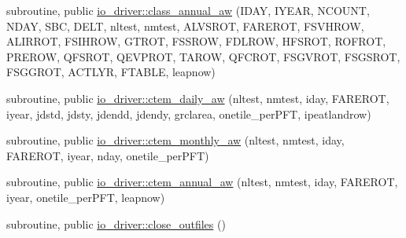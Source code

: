 {\bf }\par
\begin{DoxyCompactItemize}
\item 
subroutine, public \hyperlink{group__io__driver__class__annual__aw_ga0f389a580ed1952081408efc5dee850b}{io\+\_\+driver\+::class\+\_\+annual\+\_\+aw} (I\+D\+A\+Y, I\+Y\+E\+A\+R, N\+C\+O\+U\+N\+T, N\+D\+A\+Y, S\+B\+C, D\+E\+L\+T, nltest, nmtest, A\+L\+V\+S\+R\+O\+T, F\+A\+R\+E\+R\+O\+T, F\+S\+V\+H\+R\+O\+W, A\+L\+I\+R\+R\+O\+T, F\+S\+I\+H\+R\+O\+W, G\+T\+R\+O\+T, F\+S\+S\+R\+O\+W, F\+D\+L\+R\+O\+W, H\+F\+S\+R\+O\+T, R\+O\+F\+R\+O\+T, P\+R\+E\+R\+O\+W, Q\+F\+S\+R\+O\+T, Q\+E\+V\+P\+R\+O\+T, T\+A\+R\+O\+W, Q\+F\+C\+R\+O\+T, F\+S\+G\+V\+R\+O\+T, F\+S\+G\+S\+R\+O\+T, F\+S\+G\+G\+R\+O\+T, A\+C\+T\+L\+Y\+R, F\+T\+A\+B\+L\+E, leapnow)
\end{DoxyCompactItemize}

{\bf }\par
\begin{DoxyCompactItemize}
\item 
subroutine, public \hyperlink{group__io__driver__ctem__daily__aw_gaabb54fc6376839cc19d2b3591a963802}{io\+\_\+driver\+::ctem\+\_\+daily\+\_\+aw} (nltest, nmtest, iday, F\+A\+R\+E\+R\+O\+T, iyear, jdstd, jdsty, jdendd, jdendy, grclarea, onetile\+\_\+per\+P\+F\+T, ipeatlandrow)
\end{DoxyCompactItemize}

{\bf }\par
\begin{DoxyCompactItemize}
\item 
subroutine, public \hyperlink{group__io__driver__ctem__monthly__aw_gaefba66acca4c5138cfa2500f7a030022}{io\+\_\+driver\+::ctem\+\_\+monthly\+\_\+aw} (nltest, nmtest, iday, F\+A\+R\+E\+R\+O\+T, iyear, nday, onetile\+\_\+per\+P\+F\+T)
\end{DoxyCompactItemize}

{\bf }\par
\begin{DoxyCompactItemize}
\item 
subroutine, public \hyperlink{group__io__driver__ctem__annual__aw_gafd1b038009ed17a4f1046e11b88cf383}{io\+\_\+driver\+::ctem\+\_\+annual\+\_\+aw} (nltest, nmtest, iday, F\+A\+R\+E\+R\+O\+T, iyear, onetile\+\_\+per\+P\+F\+T, leapnow)
\end{DoxyCompactItemize}

{\bf }\par
\begin{DoxyCompactItemize}
\item 
subroutine, public \hyperlink{group__io__driver__close__outfiles_gacf096c34ff9fe20cee7785281362d9b6}{io\+\_\+driver\+::close\+\_\+outfiles} ()
\end{DoxyCompactItemize}

